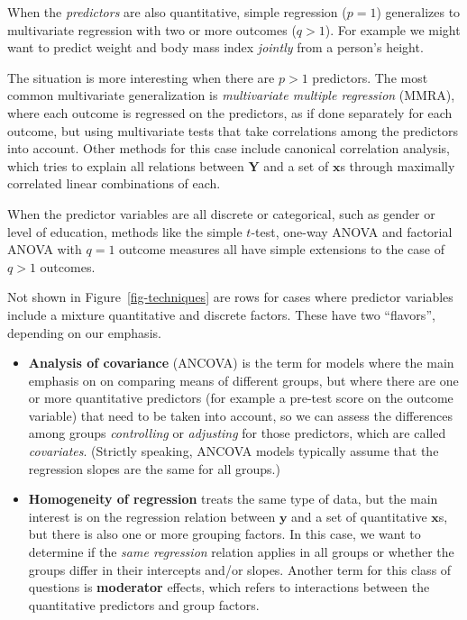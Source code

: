 \documentclass[
  letterpaper,
  10pt,
  krantz2]{krantz}
\begin{document}
When the \emph{predictors} are also quantitative, simple regression
(\(p=1\)) generalizes to multivariate regression with two or more
outcomes (\(q > 1\)). For example we might want to predict weight and
body mass index \emph{jointly} from a person's height.

The situation is more interesting when there are \(p>1\) predictors. The
most common multivariate generalization is \emph{multivariate multiple
regression} (MMRA), where each outcome is regressed on the predictors,
as if done separately for each outcome, but using multivariate tests
that take correlations among the predictors into account. Other methods
for this case include canonical correlation analysis, which tries to
explain all relations between \(\mathbf{Y}\) and a set of
\(\mathbf{x}\)s through maximally correlated linear combinations of
each.

When the predictor variables are all discrete or categorical, such as
gender or level of education, methods like the simple \(t\)-test,
one-way ANOVA and factorial ANOVA with \(q=1\) outcome measures all have
simple extensions to the case of \(q>1\) outcomes.

Not shown in Figure~\ref{fig-techniques} are rows for cases where
predictor variables include a mixture quantitative and discrete factors.
These have two ``flavors'', depending on our emphasis.

\begin{itemize}
\item
  \textbf{Analysis of covariance} (ANCOVA) is the term for models where
  the main emphasis on on comparing means of different groups, but where
  there are one or more quantitative predictors (for example a pre-test
  score on the outcome variable) that need to be taken into account, so
  we can assess the differences among groups \emph{controlling} or
  \emph{adjusting} for those predictors, which are called
  \emph{covariates}. (Strictly speaking, ANCOVA models typically assume
  that the regression slopes are the same for all groups.)
\item
  \textbf{Homogeneity of regression} treats the same type of data, but
  the main interest is on the regression relation between \(\mathbf{y}\)
  and a set of quantitative \(\mathbf{x}\)s, but there is also one or
  more grouping factors. In this case, we want to determine if the
  \emph{same regression} relation applies in all groups or whether the
  groups differ in their intercepts and/or slopes. Another term for this
  class of questions is \textbf{moderator} effects, which refers to
  interactions between the quantitative predictors and group factors.
\end{itemize}
\end{document}
